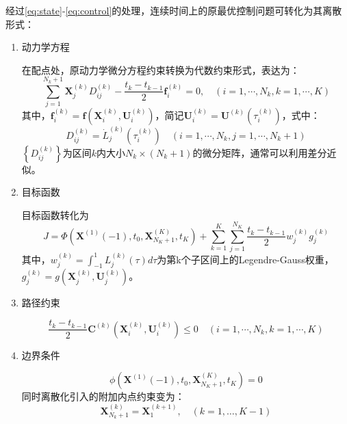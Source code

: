 经过\eqref{eq:state}-\eqref{eq:control}的处理，连续时间上的原最优控制问题可转化为其离散形式：
\begin{enumerate}
	\item 动力学方程\par
	在配点处，原动力学微分方程约束转换为代数约束形式，表达为：
	\begin{equation}
		\sum_{j=1}^{N_{k}+1} \boldsymbol{X}_{j}^{(k)} D_{i j}^{(k)}-\frac{t_{k}-t_{k-1}}{2} \boldsymbol{f}_{i}^{(k)}=0, \quad\left(i=1, \cdots, N_{k}, k=1, \cdots, K\right)
	\end{equation}
	其中，$\boldsymbol{f}_{i}^{(k)}=\boldsymbol{f}\left(\boldsymbol{X}_{i}^{(k)}, \boldsymbol{U}_{i}^{(k)}\right)$，简记$ \boldsymbol{U}_{i}^{(k)}=\boldsymbol{U}^{(k)}\left(\tau_{i}^{(k)}\right)$，式中：
	\begin{equation}
		D_{i j}^{(k)}=\dot{L}_{j}^{(k)}\left(\tau_{i}^{(k)}\right) \quad\left(i=1, \cdots, N_{k}, j=1, \cdots, N_{k}+1\right)
	\end{equation}
	$ \left\{D_{i j}^{(k)}\right\} $为区间$ k $内大小$ N_k\times (N_k+1) $的微分矩阵，通常可以利用差分近似。
	\item 目标函数\par
	目标函数转化为
	\begin{equation}
		J=\Phi\left(\boldsymbol{X}^{(1)}(-1), t_{0}, \boldsymbol{X}_{N_{K}+1}^{(K)}, t_{K}\right)+\sum_{k=1}^{K} \sum_{j=1}^{N_{K}} \frac{t_{k}-t_{k-1}}{2} w_{j}^{(k)} g_{j}^{(k)}
	\end{equation}
	其中，$w_{j}^{(k)}=\int_{-1}^{1} L_{j}^{(k)}(\tau) d \tau$为第k个子区间上的Legendre-Gauss权重，$g_{j}^{(k)}=g\left(\boldsymbol{X}_{j}^{(k)}, \boldsymbol{U}_{j}^{(k)}\right)$。
	\item 路径约束\par
	\begin{equation}
		\frac{t_{k}-t_{k-1}}{2} \boldsymbol{C}^{(k)}\left(\boldsymbol{X}_{i}^{(k)}, \boldsymbol{U}_{i}^{(k)}\right) \leq 0 \quad\left(i=1, \cdots, N_{k}, k=1, \cdots, K\right)
	\end{equation}
	\item 边界条件\par
	\begin{equation}\phi\left(\boldsymbol{X}^{(1)}(-1), t_{0}, \boldsymbol{X}_{N_{K}+1}^{(K)}, t_{K}\right)=0\end{equation}
	同时离散化引入的附加内点约束变为：
	\begin{equation}
		\boldsymbol{X}_{N_{k}+1}^{(k)}=\boldsymbol{X}_{1}^{(k+1)}, \quad(k=1, \ldots, K-1)
	\end{equation}
\end{enumerate}

